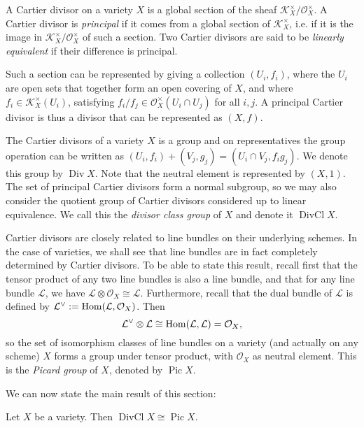 \documentclass[a4paper,openany]{scrbook}
\DeclareMathOperator{\Div}{Div}
\DeclareMathOperator{\DivCl}{DivCl}
\DeclareMathOperator{\Pic}{Pic}
\begin{document}
\begin{defn}
A Cartier divisor on a variety $X$ is a global section of the sheaf $\mathcal{K}_X^\times/\mathcal{O}_X^\times$. A Cartier divisor is \textit{principal} if it comes from a global section of $\mathcal{K}_X^\times$, i.e. if it is the image in $\mathcal{K}_X^\times/\mathcal{O}_X^\times$ of such a section. Two Cartier divisors are said to be \textit{linearly equivalent} if their difference is principal.
\end{defn}

\begin{remark}
Such a section can be represented by giving a collection $(U_i,f_i)$, where the $U_i$ are open sets that together form an open covering of $X$, and where $f_i\in\mathcal{K}_X^\times(U_i)$, satisfying $f_i/f_j\in\mathcal{O}_X^\times(U_i\cap U_j)$ for all $i,j$. A principal Cartier divisor is thus a divisor that can be represented as $(X,f)$.
\end{remark}

The Cartier divisors of a variety $X$ is a group and on representatives the group operation can be written as $(U_i,f_i)+(V_j,g_j)=(U_i\cap V_j,f_ig_j)$. We denote this group by $\Div X$. Note that the neutral element is represented by $(X,1)$. The set of principal Cartier divisors form a normal subgroup, so we may also consider the quotient group of Cartier divisors considered up to linear equivalence. We call this the \textit{divisor class group} of $X$ and denote it $\DivCl X$.

Cartier divisors are closely related to line bundles on their underlying schemes. In the case of varieties, we shall see that line bundles are in fact completely determined by Cartier divisors. To be able to state this result, recall first that the tensor product of any two line bundles is also a line bundle, and that for any line bundle $\mathcal{L}$, we have $\mathcal{L}\otimes\mathcal{O}_X\cong\mathcal{L}$. Furthermore, recall that the dual bundle of $\mathcal{L}$ is defined by $\mathcal{L}^\vee:=\operatorname{Hom}(\mathcal{L},\mathcal{O}_X)$. Then
$$\mathcal{L}^\vee\otimes\mathcal{L}\cong\operatorname{Hom}(\mathcal{L},\mathcal{L})=\mathcal{O}_X,$$
so the set of isomorphism classes of line bundles on a variety (and actually on any scheme) $X$ forms a group under tensor product, with $\mathcal{O}_X$ as neutral element. This is the \textit{Picard group} of $X$, denoted by $\Pic X$.

We can now state the main result of this section:

\begin{prop}
Let $X$ be a variety. Then $\DivCl X\cong\Pic X$.
\end{prop}
\end{document}
